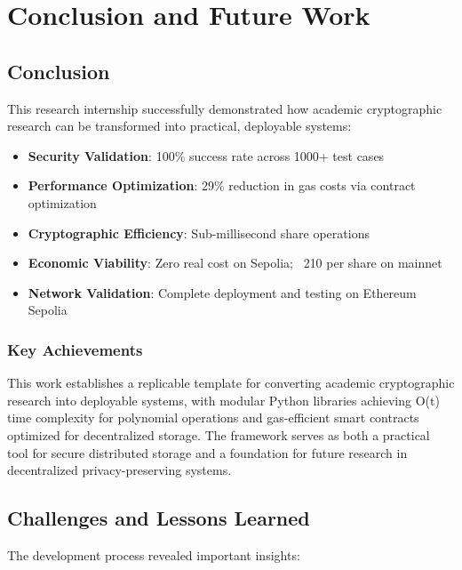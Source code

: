 \documentclass[12pt,a4paper]{article}
\newcommand{\rupee}{\text{Rs.}}  %
\begin{document}
\section{Conclusion and Future Work}
\subsection{Conclusion}

This research internship successfully demonstrated how academic cryptographic research can be transformed into practical, deployable systems:

\begin{itemize}[leftmargin=15pt]
    \item \textbf{Security Validation}: 100\% success rate across 1000+ test cases
    \item \textbf{Performance Optimization}: 29\% reduction in gas costs via contract optimization
    \item \textbf{Cryptographic Efficiency}: Sub-millisecond share operations
    \item \textbf{Economic Viability}: Zero real cost on Sepolia; ~\rupee210 per share on mainnet
    \item \textbf{Network Validation}: Complete deployment and testing on Ethereum Sepolia
\end{itemize}

\subsubsection{Key Achievements}

This work establishes a replicable template for converting academic cryptographic research into deployable systems, with modular Python libraries achieving O(t) time complexity for polynomial operations and gas-efficient smart contracts optimized for decentralized storage. The framework serves as both a practical tool for secure distributed storage and a foundation for future research in decentralized privacy-preserving systems.

\subsection{Challenges and Lessons Learned}

The development process revealed important insights:
\end{document}
